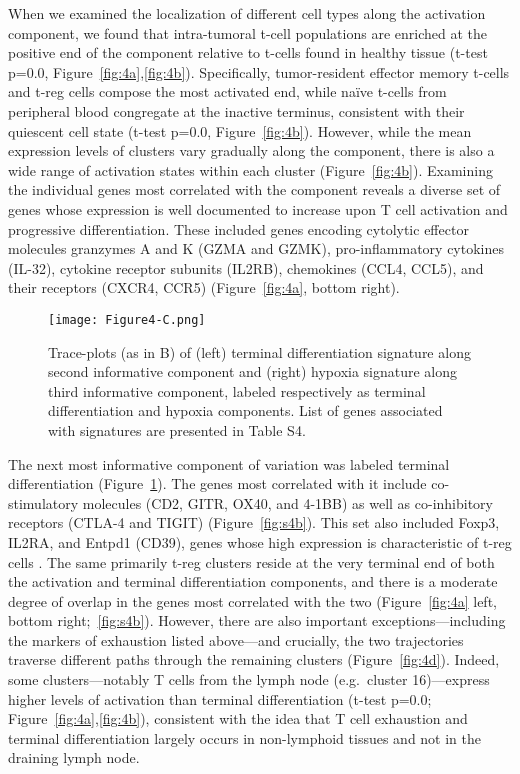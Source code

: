 When we examined the localization of different cell types along the activation component, we found that intra-tumoral t-cell populations are enriched at the positive end of the component relative to t-cells found in healthy tissue (t-test p=0.0, Figure~\ref{fig:4a},\ref{fig:4b}).
Specifically, tumor-resident effector memory t-cells and t-reg cells compose the most activated end, while naïve t-cells from peripheral blood congregate at the inactive terminus, consistent with their quiescent cell state (t-test p=0.0, Figure~\ref{fig:4b}).
However, while the mean expression levels of clusters vary gradually along the component, there is also a wide range of activation states within each cluster (Figure~\ref{fig:4b}).
Examining the individual genes most correlated with the component reveals a diverse set of genes whose expression is well documented to increase upon T cell activation and progressive differentiation.
These included genes encoding cytolytic effector molecules granzymes A and K (GZMA and GZMK), pro-inflammatory cytokines (IL-32), cytokine receptor subunits (IL2RB), chemokines (CCL4, CCL5), and their receptors (CXCR4, CCR5) (Figure~\ref{fig:4a}, bottom right).

\begin{figure}
\centering
\texttt{[image: Figure4-C.png]}
\caption{Trace-plots (as in B) of (left) terminal differentiation signature along second informative component and (right) hypoxia signature along third informative component, labeled respectively as terminal differentiation and hypoxia components.
List of genes associated with signatures are presented in Table S4.}
\label{fig:4c}
\end{figure}

The next most informative component of variation was labeled terminal differentiation (Figure~\ref{fig:4c}). 
The genes most correlated with it include co-stimulatory molecules (CD2, GITR, OX40, and 4-1BB) as well as co-inhibitory receptors (CTLA-4 and TIGIT) (Figure~\ref{fig:s4b}).
This set also included Foxp3, IL2RA, and Entpd1 (CD39), genes whose high expression is characteristic of t-reg cells \citep{Josefowicz2012}.
The same primarily t-reg clusters reside at the very terminal end of both the activation and terminal differentiation components, and there is a moderate degree of overlap in the genes most correlated with the two (Figure~\ref{fig:4a} left, bottom right;~\ref{fig:s4b}).
However, there are also important exceptions---including the markers of exhaustion listed above---and crucially, the two trajectories traverse different paths through the remaining clusters (Figure~\ref{fig:4d}).
Indeed, some clusters---notably T cells from the lymph node (e.g.\ cluster 16)---express higher levels of activation than terminal differentiation (t-test p=0.0; Figure~\ref{fig:4a},\ref{fig:4b}), consistent with the idea that T cell exhaustion and terminal differentiation largely occurs in non-lymphoid tissues and not in the draining lymph node.


